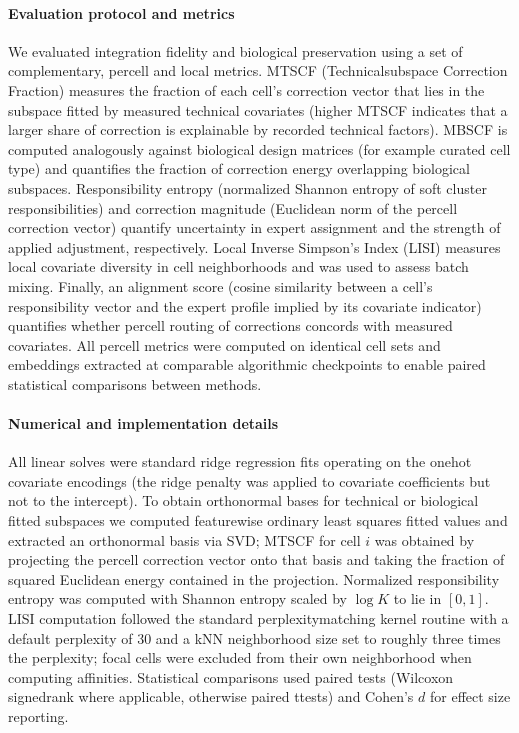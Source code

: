 \documentclass{article}
\begin{document}
\paragraph{Evaluation protocol and metrics} We evaluated integration fidelity and biological preservation using a set of complementary, per\-cell and local metrics. MTSCF (Technical\-subspace Correction Fraction) measures the fraction of each cell’s correction vector that lies in the subspace fitted by measured technical covariates (higher MTSCF indicates that a larger share of correction is explainable by recorded technical factors). MBSCF is computed analogously against biological design matrices (for example curated cell type) and quantifies the fraction of correction energy overlapping biological subspaces. Responsibility entropy (normalized Shannon entropy of soft cluster responsibilities) and correction magnitude (Euclidean norm of the per\-cell correction vector) quantify uncertainty in expert assignment and the strength of applied adjustment, respectively. Local Inverse Simpson’s Index (LISI) measures local covariate diversity in cell neighborhoods and was used to assess batch mixing. Finally, an alignment score (cosine similarity between a cell’s responsibility vector and the expert profile implied by its covariate indicator) quantifies whether per\-cell routing of corrections concords with measured covariates. All per\-cell metrics were computed on identical cell sets and embeddings extracted at comparable algorithmic checkpoints to enable paired statistical comparisons between methods.

\paragraph{Numerical and implementation details} All linear solves were standard ridge regression fits operating on the one\-hot covariate encodings (the ridge penalty was applied to covariate coefficients but not to the intercept). To obtain orthonormal bases for technical or biological fitted subspaces we computed feature\-wise ordinary least squares fitted values and extracted an orthonormal basis via SVD; MTSCF for cell $i$ was obtained by projecting the per\-cell correction vector onto that basis and taking the fraction of squared Euclidean energy contained in the projection. Normalized responsibility entropy was computed with Shannon entropy scaled by $\log K$ to lie in $[0,1]$. LISI computation followed the standard perplexity\-matching kernel routine with a default perplexity of 30 and a kNN neighborhood size set to roughly three times the perplexity; focal cells were excluded from their own neighborhood when computing affinities. Statistical comparisons used paired tests (Wilcoxon signed\-rank where applicable, otherwise paired t\-tests) and Cohen’s $d$ for effect size reporting.
\end{document}
